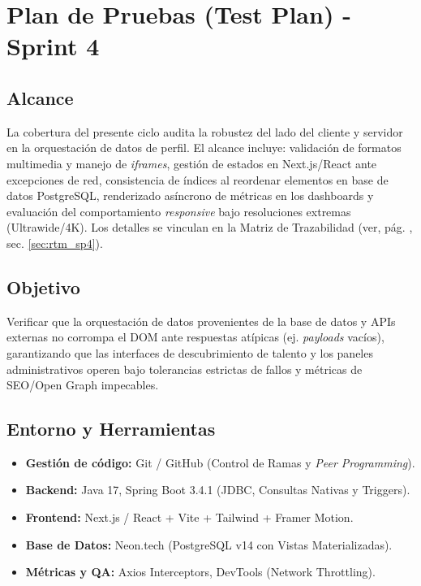 \section{Plan de Pruebas (Test Plan) - Sprint 4}
\label{sec:plan_pruebas_sp4}

\subsection{Alcance}
La cobertura del presente ciclo audita la robustez del lado del cliente y servidor en la orquestación de datos de perfil. El alcance incluye: validación de formatos multimedia y manejo de \textit{iframes}, gestión de estados en Next.js/React ante excepciones de red, consistencia de índices al reordenar elementos en base de datos PostgreSQL, renderizado asíncrono de métricas en los dashboards y evaluación del comportamiento \textit{responsive} bajo resoluciones extremas (Ultrawide/4K). Los detalles se vinculan en la Matriz de Trazabilidad (ver, pág. \pageref{sec:rtm_sp4}, sec. \ref{sec:rtm_sp4}).

\subsection{Objetivo}
Verificar que la orquestación de datos provenientes de la base de datos y APIs externas no corrompa el DOM ante respuestas atípicas (ej. \textit{payloads} vacíos), garantizando que las interfaces de descubrimiento de talento y los paneles administrativos operen bajo tolerancias estrictas de fallos y métricas de SEO/Open Graph impecables.

\subsection{Entorno y Herramientas}
\begin{itemize}[noitemsep]
    \item \textbf{Gestión de código:} Git / GitHub (Control de Ramas y \textit{Peer Programming}).
    \item \textbf{Backend:} Java 17, Spring Boot 3.4.1 (JDBC, Consultas Nativas y Triggers).
    \item \textbf{Frontend:} Next.js / React + Vite + Tailwind + Framer Motion.
    \item \textbf{Base de Datos:} Neon.tech (PostgreSQL v14 con Vistas Materializadas).
    \item \textbf{Métricas y QA:} Axios Interceptors, DevTools (Network Throttling).
\end{itemize}

